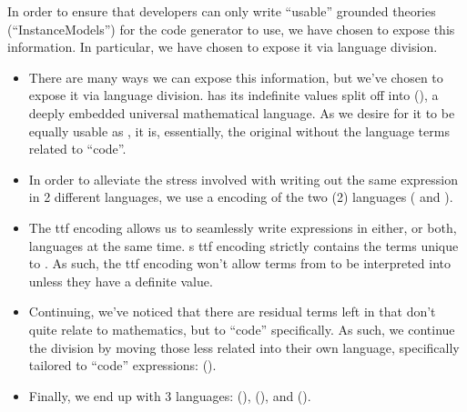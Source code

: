 In order to ensure that developers can only write ``usable'' grounded theories
(``InstanceModels'') for the code generator to use, we have chosen to expose
this information. In particular, we have chosen to expose it via language
division.

\languageDivision{}


\begin{itemize}

	\item There are many ways we can expose this information, but we've chosen
	      to expose it via language division. \Expr{} has its indefinite values
	      split off into \ModelExpr{} (), a deeply
	      embedded universal mathematical language. As we desire for it to be
	      equally usable as \Expr{}, it is, essentially, the original \Expr{}
	      without the language terms related to ``code''.

	\item In order to alleviate the stress involved with writing out the same
	      expression in 2 different languages, we use a  encoding of
	      the two (2) languages ( and
	      ).

	\item The \acs{ttf} encoding allows us to seamlessly write expressions in
	      either, or both, languages at the same time. \ModelExpr{}s \acs{ttf}
	      encoding strictly contains the terms unique to \ModelExpr{}. As such,
	      the \acs{ttf} encoding won't allow terms from \ModelExpr{} to be
	      interpreted into \Expr{} unless they have a definite value.

	\item Continuing, we've noticed that there are residual terms left in
	      \Expr{} that don't quite relate to mathematics, but to ``code''
	      specifically. As such, we continue the division by moving those less
	      related into their own language, specifically tailored to ``code''
	      expressions: \CodeExpr{} ().

	\item Finally, we end up with 3 languages: \Expr{}
	      (), \ModelExpr{}
	      (), and \CodeExpr{}
	      ().

\end{itemize}


